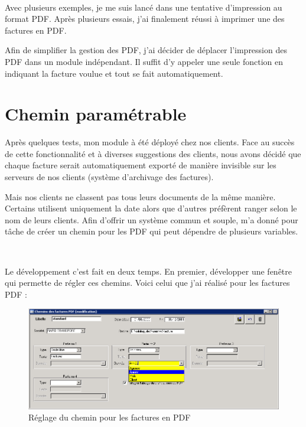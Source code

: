 ~

Avec plusieurs exemples, je me suis lancé dans une tentative d'impression au format PDF. Après plusieurs essais, j'ai finalement réussi à imprimer une des factures en PDF.

Afin de simplifier la gestion des PDF, j'ai décider de déplacer l'impression des PDF dans un module indépendant. Il suffit d'y appeler une seule fonction en indiquant la facture voulue et tout se fait automatiquement.

\section{Chemin paramétrable}
\label{pdf_param}
Après quelques tests, mon module à été déployé chez nos clients. Face au succès de cette fonctionnalité et à diverses suggestions des clients, nous avons décidé que chaque facture serait automatiquement exporté de manière invisible sur les serveurs de nos clients (système d'archivage des factures).

Mais nos clients ne classent pas tous leurs documents de la même manière. Certains utilisent uniquement la date alors que d'autres préfèrent ranger selon le nom de leurs clients. Afin d'offrir un système commun et souple, \solulog{} m'a donné pour tâche de créer un chemin pour les PDF qui peut dépendre de plusieurs variables.

~

Le développement c'est fait en deux temps. En premier, développer une fenêtre qui permette de régler ces chemins. Voici celui que j'ai réalisé pour les factures PDF :
\begin{figure}[h!]
	\begin{center}
		\includegraphics[scale=.78]{Contenu/Synthese_SeptembreAvril/Images/Chemin_PDF.png}
	\end{center}

	\caption{Réglage du chemin pour les factures en PDF}
	\label{segment_NAD_CA}
\end{figure}

